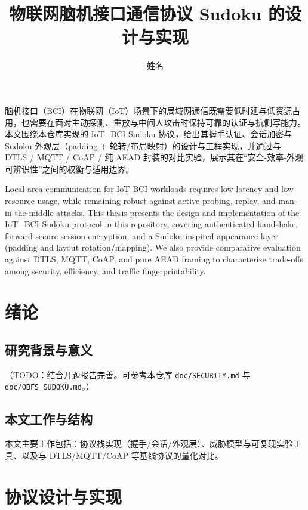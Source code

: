 \documentclass[bachelor]{thesis-uestc}
\title{物联网脑机接口通信协议 Sudoku 的设计与实现}{Design and Implementation of Sudoku: An IoT BCI Communication Protocol}
\author{姓名}{Name}
\begin{document}
\makecover

\begin{chineseabstract}
脑机接口（BCI）在物联网（IoT）场景下的局域网通信既需要低时延与低资源占用，也需要在面对主动探测、重放与中间人攻击时保持可靠的认证与抗侧写能力。本文围绕本仓库实现的 IoT\_BCI-Sudoku 协议，给出其握手认证、会话加密与 Sudoku 外观层（padding + 轮转/布局映射）的设计与工程实现，并通过与 DTLS / MQTT / CoAP / 纯 AEAD 封装的对比实验，展示其在“安全-效率-外观可辨识性”之间的权衡与适用边界。

\end{chineseabstract}

\begin{englishabstract}
Local-area communication for IoT BCI workloads requires low latency and low resource usage, while remaining robust against active probing, replay, and man-in-the-middle attacks. This thesis presents the design and implementation of the IoT\_BCI-Sudoku protocol in this repository, covering authenticated handshake, forward-secure session encryption, and a Sudoku-inspired appearance layer (padding and layout rotation/mapping). We also provide comparative evaluation against DTLS, MQTT, CoAP, and pure AEAD framing to characterize trade-offs among security, efficiency, and traffic fingerprintability.

\end{englishabstract}

\thesistableofcontents

\chapter{绪论}
\section{研究背景与意义}
（TODO：结合开题报告完善。可参考本仓库 \texttt{doc/SECURITY.md} 与 \texttt{doc/OBFS\_SUDOKU.md}。）

\section{本文工作与结构}
本文主要工作包括：协议栈实现（握手/会话/外观层）、威胁模型与可复现实验工具、以及与 DTLS/MQTT/CoAP 等基线协议的量化对比。

\chapter{协议设计与实现}
\end{document}
